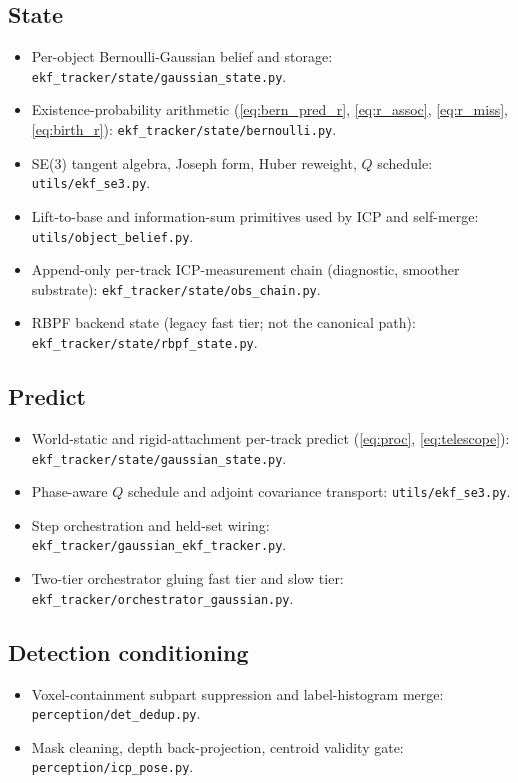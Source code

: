 \documentclass[11pt]{article}
\newcommand{\file}[1]{\texttt{#1}}
\begin{document}
\subsection*{State}
\begin{itemize}[leftmargin=1.5em,itemsep=0pt,topsep=2pt]
\item Per-object Bernoulli-Gaussian belief and storage: \file{ekf\_tracker/state/gaussian\_state.py}.
\item Existence-probability arithmetic (\eqref{eq:bern_pred_r}, \eqref{eq:r_assoc}, \eqref{eq:r_miss}, \eqref{eq:birth_r}): \file{ekf\_tracker/state/bernoulli.py}.
\item SE(3) tangent algebra, Joseph form, Huber reweight, $Q$ schedule: \file{utils/ekf\_se3.py}.
\item Lift-to-base and information-sum primitives used by ICP and self-merge: \file{utils/object\_belief.py}.
\item Append-only per-track ICP-measurement chain (diagnostic, smoother substrate): \file{ekf\_tracker/state/obs\_chain.py}.
\item RBPF backend state (legacy fast tier; not the canonical path): \file{ekf\_tracker/state/rbpf\_state.py}.
\end{itemize}

\subsection*{Predict}
\begin{itemize}[leftmargin=1.5em,itemsep=0pt,topsep=2pt]
\item World-static and rigid-attachment per-track predict (\eqref{eq:proc}, \eqref{eq:telescope}): \file{ekf\_tracker/state/gaussian\_state.py}.
\item Phase-aware $Q$ schedule and adjoint covariance transport: \file{utils/ekf\_se3.py}.
\item Step orchestration and held-set wiring: \file{ekf\_tracker/gaussian\_ekf\_tracker.py}.
\item Two-tier orchestrator gluing fast tier and slow tier: \file{ekf\_tracker/orchestrator\_gaussian.py}.
\end{itemize}

\subsection*{Detection conditioning}
\begin{itemize}[leftmargin=1.5em,itemsep=0pt,topsep=2pt]
\item Voxel-containment subpart suppression and label-histogram merge: \file{perception/det\_dedup.py}.
\item Mask cleaning, depth back-projection, centroid validity gate: \file{perception/icp\_pose.py}.
\end{itemize}
\end{document}
